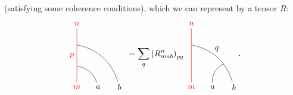 \begin{definition}
\begin{equation}
		\end{equation}
	(satisfying some coherence conditions), which we can represent by a tensor $R$:
		\begin{equation}
			\begin{tikzpicture}[scale=0.9,baseline=(current bounding box.center)]
			\node[red](m) at (0,0) {$m$};
			\node(b) at (1,0) {$a$};
			\node(a) at (2,0) {$b$};
			\node[red](abm) at (0,3) {$n$};
			\draw[red] (m) to node [left] {$p$} (abm);
			\draw (b) to [bend right] (0,1);
			\draw (a) to [bend right] (0,2);
			\end{tikzpicture}\ =\sum_q\left(R^n_{mab}\right)_{pq}
			\begin{tikzpicture}[scale=0.9,baseline=(current bounding box.center)]
			\node[red](m) at (0,0) {$m$};
			\node(b) at (1,0) {$a$};
			\node(a) at (2,0) {$b$};
			\node[red](abm) at (0,3) {$n$};
			\node(ab) at (1.2,1.8) {$q$};
			\draw[red] (m) to (abm);
			\draw (b) to [bend left] (1.5,1.1);
			\draw (a) to [bend right] (0,2);
			\end{tikzpicture}.\label{eqn:R}
		\end{equation}
	

\end{definition}
